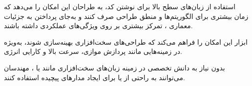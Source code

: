  
استفاده از زبان‌های سطح بالا برای نوشتن کد، به طراحان این امکان را می‌دهد که زمان بیشتری برای الگوریتم‌ها و منطق طراحی صرف کنند و به‌جای پرداختن به جزئیات معماری ، تمرکز بیشتری بر روی ویژگی‌های عملکردی داشته باشند.

 
ابزار  این امکان را فراهم می‌کند که طراحی‌های سخت‌افزاری بهینه‌سازی شوند، به‌ویژه در زمینه‌هایی مانند پردازش موازی، سرعت بالا و کارایی انرژی.

 
بدون نیاز به دانش تخصصی در زمینه زبان‌های سخت‌افزاری مانند  یا ، مهندسان می‌توانند به راحتی از یا  برای ایجاد مدارهای پیچیده استفاده کنند.

